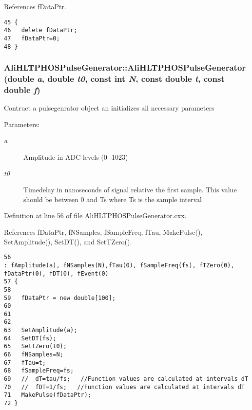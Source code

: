 References f\-Data\-Ptr.

\footnotesize\begin{verbatim}45 {
46   delete fDataPtr;
47   fDataPtr=0;
48 }
\end{verbatim}\normalsize 


\subsubsection{\setlength{\rightskip}{0pt plus 5cm}Ali\-HLTPHOSPulse\-Generator::Ali\-HLTPHOSPulse\-Generator (double {\em a}, double {\em t0}, const int {\em N}, const double {\em t}, const double {\em f})}\label{classAliHLTPHOSPulseGenerator_AliHLTPHOSPulseGeneratora2}


Contruct a pulsegenrator object an initializes all necessary parameters \begin{Desc}
\item[Parameters:]
\begin{description}
\item[{\em a}]Amplitude in ADC levels (0 -1023) \item[{\em t0}]Timedelay in nanoseconds of signal relative the first sample. This value should be between 0 and Ts where Ts is the sample interval \end{description}
\end{Desc}


Definition at line 56 of file Ali\-HLTPHOSPulse\-Generator.cxx.

References f\-Data\-Ptr, f\-NSamples, f\-Sample\-Freq, f\-Tau, Make\-Pulse(), Set\-Amplitude(), Set\-DT(), and Set\-TZero().

\footnotesize\begin{verbatim}56                                                                                                  : fAmplitude(a), fNSamples(N),fTau(0), fSampleFreq(fs), fTZero(0), fDataPtr(0), fDT(0), fEvent(0)
57 {
58 
59   fDataPtr = new double[100];
60 
61 
62 
63   SetAmplitude(a);
64   SetDT(fs);
65   SetTZero(t0);
66   fNSamples=N;
67   fTau=t;
68   fSampleFreq=fs;
69   //  dT=tau/fs;   //Function values are calculated at intervals dT
70   //  fDT=1/fs;   //Function values are calculated at intervals dT
71   MakePulse(fDataPtr);
72 }
\end{verbatim}\normalsize 


